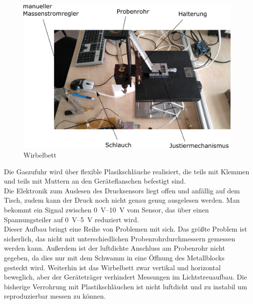 \begin{figure}[h]
	\begin{center}
		\includegraphics[scale=0.7]{Altes_Wirbelbett_oben.png}
		\caption{Wirbelbett}
	\end{center}
\end{figure}	


Die Gaszufuhr wird über flexible Plasikschläuche realisiert, die teils mit Klemmen und teils mit Muttern an den Geräteflanschen befestigt sind. \\
Die Elektronik zum Auslesen des Drucksensors liegt offen und anfällig auf dem Tisch, zudem kann der Druck noch nicht genau genug ausgelesen werden. Man bekommt ein Signal zwischen \SIrange{0}{10}{\volt} vom Sensor, das über einen Spannungsteiler auf \SIrange{0}{5}{\volt} reduziert wird. \\
Dieser Aufbau bringt eine Reihe von Problemen mit sich. Das größte Problem ist sicherlich, das nicht mit unterschiedlichen Probenrohrdurchmessern gemessen werden kann. Außerdem ist der luftdichte Anschluss am Probenrohr nicht gegeben, da dies nur mit dem Schwamm in eine Öffnung des Metallblocks gesteckt wird.
Weiterhin ist das Wirbelbett zwar vertikal und horizontal beweglich, aber der Geräteträger verhindert Messungen im Lichtstreuaufbau.
Die bisherige Verrohrung mit Plastikschläuchen ist nicht luftdicht und zu instabil um reproduzierbar messen zu können. \\


